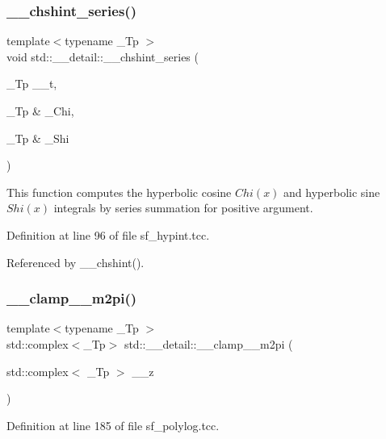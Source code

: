 \subsubsection{\texorpdfstring{\+\_\+\+\_\+chshint\+\_\+series()}{\_\_chshint\_series()}}
{\footnotesize\ttfamily template$<$typename \+\_\+\+Tp $>$ \\
void std\+::\+\_\+\+\_\+detail\+::\+\_\+\+\_\+chshint\+\_\+series (\begin{DoxyParamCaption}\item[{\+\_\+\+Tp}]{\+\_\+\+\_\+t,  }\item[{\+\_\+\+Tp \&}]{\+\_\+\+Chi,  }\item[{\+\_\+\+Tp \&}]{\+\_\+\+Shi }\end{DoxyParamCaption})}



This function computes the hyperbolic cosine $ Chi(x) $ and hyperbolic sine $ Shi(x) $ integrals by series summation for positive argument. 



Definition at line 96 of file sf\+\_\+hypint.\+tcc.



Referenced by \+\_\+\+\_\+chshint().

\mbox{\label{namespacestd_1_1____detail_a4b52c9c0f24edd3c61c771f55f20002b}} 
\subsubsection{\texorpdfstring{\+\_\+\+\_\+clamp\+\_\+\_\+m2pi()}{\_\_clamp\_0\_m2pi()}}
{\footnotesize\ttfamily template$<$typename \+\_\+\+Tp $>$ \\
std\+::complex$<$\+\_\+\+Tp$>$ std\+::\+\_\+\+\_\+detail\+::\+\_\+\+\_\+clamp\+\_\+\_\+m2pi (\begin{DoxyParamCaption}\item[{std\+::complex$<$ \+\_\+\+Tp $>$}]{\+\_\+\+\_\+z }\end{DoxyParamCaption})}



Definition at line 185 of file sf\+\_\+polylog.\+tcc.



